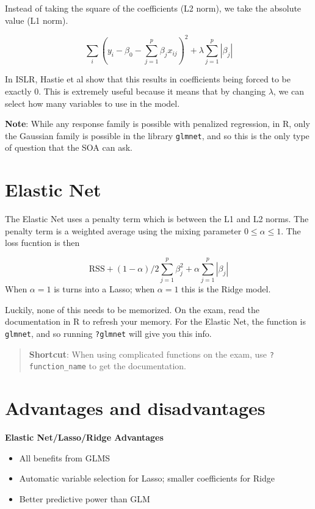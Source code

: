 \documentclass[openany]{book}
\providecommand{\tightlist}{%
  \setlength{\itemsep}{0pt}\setlength{\parskip}{0pt}}
\begin{document}
Instead of taking the square of the coefficients (L2 norm), we take the absolute value (L1 norm).

\[
\sum_i(y_i - \beta_0 - \sum_{j = 1}^p\beta_j x_{ij})^2 + \lambda \sum_{j = 1}^p|\beta_j|
\]

In ISLR, Hastie et al show that this results in coefficients being forced to be exactly 0. This is extremely useful because it means that by changing \(\lambda\), we can select how many variables to use in the model.

\textbf{Note}: While any response family is possible with penalized regression, in R, only the Gaussian family is possible in the library \texttt{glmnet}, and so this is the only type of question that the SOA can ask.

\hypertarget{elastic-net}{%
\section{Elastic Net}\label{elastic-net}}

The Elastic Net uses a penalty term which is between the L1 and L2 norms. The penalty term is a weighted average using the mixing parameter \(0 \leq \alpha \leq 1\). The loss fucntion is then

\[\text{RSS} + (1 - \alpha)/2 \sum_{j = 1}^{p}\beta_j^2 + \alpha \sum_{j = 1}^p |\beta_j|\]
When \(\alpha = 1\) is turns into a Lasso; when \(\alpha = 1\) this is the Ridge model.

Luckily, none of this needs to be memorized. On the exam, read the documentation in R to refresh your memory. For the Elastic Net, the function is \texttt{glmnet}, and so running \texttt{?glmnet} will give you this info.

\begin{quote}
\textbf{Shortcut}: When using complicated functions on the exam, use \texttt{?function\_name} to get the documentation.
\end{quote}

\hypertarget{advantages-and-disadvantages-1}{%
\section{Advantages and disadvantages}\label{advantages-and-disadvantages-1}}

\textbf{Elastic Net/Lasso/Ridge Advantages}

\begin{itemize}
\tightlist
\item
  All benefits from GLMS
\item
  Automatic variable selection for Lasso; smaller coefficients for Ridge
\item
  Better predictive power than GLM
\end{itemize}
\end{document}
